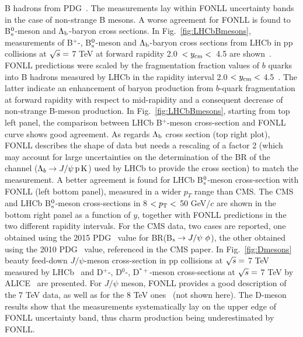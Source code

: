 B hadrons from PDG~\cite{Agashe:2014kda}.
The measurements lay within FONLL uncertainty bands in the case 
of non-strange B mesons. A worse agreement for FONLL is found to B$^0_{\rm s}$-meson
and $\Lambda_{\rm b}$-baryon cross sections.
In Fig.~\ref{fig:LHCbBmesons}, measurements of B$^{+}$-, B$^0_{\rm s}$-meson
and $\Lambda_{\rm b}$-baryon cross sections from
LHCb in pp collisions at $\sqrt{s} =$ 7 TeV at forward rapidity 
\mbox{2.0 $< y_{\rm cm} <$ 4.5} are shown~\cite{Aaij:2013noa,Aaij:2015fea}.
FONLL predictions were scaled by the fragmentation fraction values 
of $b$ quarks into B hadrons measured by LHCb in the rapidity interval 
2.0 $< y_{\rm cm} <$ 4.5~\cite{Aaij:2011jp}. The latter indicate an 
enhancement of baryon production from $b$-quark fragmentation at forward rapidity with respect to 
mid-rapidity and a consequent decrease of non-strange B-meson production. 
In Fig.~\ref{fig:LHCbBmesons}, starting from top left panel, the 
comparison between LHCb B$^{+}$-meson cross-section and FONLL
 curve shows good agreement. As regards $\Lambda_{\rm b}$ cross section 
(top right plot), FONLL describes the shape of data 
but needs a rescaling of a factor 2 (which may account 
for large uncertainties on the determination of the BR of the channel ($\Lambda_{b} \rightarrow J/\psi \,{\rm p\, K}$) 
used by LHCb to provide the cross section) to match the measurement. 
 A better agreement is found for 
LHCb B$^0_{\rm s}$-meson cross-section with FONLL (left bottom panel), measured in a wider 
$p_{T}$ range than CMS. The CMS and LHCb B$^0_{\rm s}$-meson cross-sections in 
8 $< p_{\rm T} <$ 50 GeV/$c$ are shown in 
the bottom right panel as a function of $y$, together with FONLL predictions in the 
two different rapidity intervals. For the CMS data, two cases are 
reported, one obtained using the 2015 PDG~\cite{Agashe:2014kda} value for 
BR(B$_{\rm s} \rightarrow J/{\rm \psi} ~\phi$),
the other obtained using the 2010 PDG~\cite{Nakamura:2010zzi} value, 
referenced in the CMS paper. 
In Fig.~\ref{fig:Dmesons} beauty feed-down $J/\psi$-meson 
cross-section in pp collisions at $\sqrt{s} = $ 7 TeV measured by LHCb~\cite{Aaij:2011jh} and 
D$^{+}$-, D$^{0}$-, D$^{*+}$-meson cross-sections at $\sqrt{s} = $ 7 TeV by ALICE~\cite{ALICE:2011aa}
are presented. For $J/\psi$ meson, FONLL provides a good description of 
the 7 TeV data, as well as for the 8 TeV ones~\cite{Aaij:2013yaa} (not shown here). 
The D-meson results show that the measurements 
systematically lay on the upper edge of FONLL uncertainty 
band, thus charm production being underestimated by FONLL.\\
